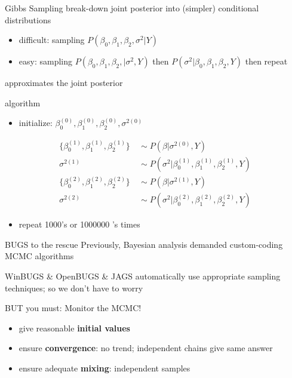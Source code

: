 \documentclass[presentation]{beamer}
\begin{document}
\begin{frame}[label=sec-31]{Gibbs Sampling}
break-down joint posterior into (simpler) conditional distributions
\begin{itemize}
\item difficult: sampling $P(\beta_0,\beta_1,\beta_2,\sigma^2\vert Y)$
\item easy: sampling $P(\beta_0,\beta_1,\beta_2,\vert\sigma^2, Y)$ then $P(\sigma^2\vert\beta_0,\beta_1,\beta_2,Y)$ then repeat
\end{itemize}
approximates the joint posterior
\begin{block}{algorithm}
\begin{itemize}
\item initialize: $\beta_0^{(0)},\beta_1^{(0)},\beta_2^{(0)},\sigma^{2(0)}$
\end{itemize}
\begin{equation}
\begin{aligned}
\{\beta_0^{(1)},\beta_1^{(1)},\beta_2^{(1)}\} &\ \sim P(\beta \vert \sigma^{2(0)},Y) \\
\sigma^{2(1)} &\ \sim P(\sigma^2 \vert \beta_0^{(1)},\beta_1^{(1)},\beta_2^{(1)},Y) \\
\{\beta_0^{(2)},\beta_1^{(2)},\beta_2^{(2)}\} &\ \sim P(\beta \vert \sigma^{2(1)},Y) \\
\sigma^{2(2)} &\ \sim P(\sigma^2 \vert \beta_0^{(2)},\beta_1^{(2)},\beta_2^{(2)},Y)
\end{aligned}
\end{equation}
\begin{itemize}
\item repeat 1000's or 1000000 's times
\end{itemize}
\end{block}
\end{frame}
\begin{frame}[label=sec-32]{BUGS to the rescue}
Previously, Bayesian analysis demanded custom-coding MCMC algorithms
\begin{block}{WinBUGS \& OpenBUGS \& JAGS}
automatically use appropriate sampling techniques; so we don't have to worry
\end{block}

\begin{block}{BUT you must: Monitor the MCMC!}
\begin{itemize}
\item give reasonable \textbf{initial values}
\item ensure \textbf{convergence}: no trend; independent chains give same answer
\item ensure adequate \textbf{mixing}: independent samples
\end{itemize}
\end{block}
\end{frame}
\end{document}
